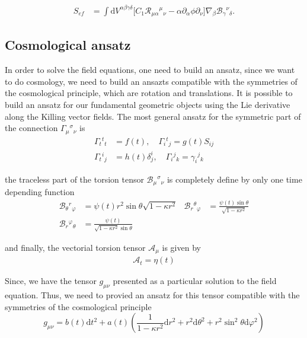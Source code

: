 \documentclass[10pt,a4paper]{article}
\begin{document}
\begin{equation*}
    \begin{split}
      S_{ef}
      & =
      \int  \mathrm{d}V^{\alpha \beta \gamma \delta} \bigg[
      C_1 \mathcal{R}_{\mu\alpha}{}^{\mu}{}_{\nu} - \alpha \partial_{\alpha}\phi \partial_{\nu}
      \bigg]\nabla_\beta \mathcal{B}_{\gamma}{}^{\nu}{}_{\delta}.
    \end{split}
  \end{equation*}


\subsection{Cosmological ansatz}

In order to solve the field equations, one need to build an ansatz, since we want to do cosmology, we need to build an ansazts
compatible with the symmetries of the cosmological principle, which are rotation and translations. It is possible to build an ansatz for our
fundamental geometric objects using the Lie derivative along the Killing vector fields. The most general ansatz for the symmetric part of the 
connection $\Gamma_{\mu}{}^{\sigma}{}_{\nu}$ is
\begin{align}
      \Gamma_{t}{}^{t}{ }_{t} & =f(t), \quad \Gamma_{i}{ }^{t}{ }_{j}=g(t) S_{i j} \\
      \Gamma_{t}{ }^{i}{ }_{j} &= h(t) \delta^{i}_{j}, \quad \Gamma_{i}{ }^{j}{ }_{k}= \gamma_{i}{ }^{j}{ }_{k}
\end{align}
  
the traceless part of the torsion tensor $\mathcal{B}_{\mu}{}^{\sigma}{}_{\nu}$ is completely define by only one time depending function
  \begin{align*}
      \mathcal{B}_{\theta}{ }^{r}{ }_{\varphi} & = \psi (t) r^2\sin\theta \sqrt{1 - \kappa r^2} &
      \mathcal{B}_{r}{}^{\theta}{}_{\varphi} & =\frac{\psi (t) \sin \theta}{\sqrt{1 - \kappa r^2}} \\
      \mathcal{B}_{r}{}^{\varphi}{}_{\theta} & =\frac{\psi(t)}{ \sqrt{1-\kappa r^{2}} \sin \theta}
  \end{align*}
  
and finally, the vectorial torsion tensor $\mathcal{A}_\mu$ is given by
  \begin{align}
      \mathcal{A}_{t} = \eta(t)
  \end{align}

Since, we have the tensor $g_{\mu\nu}$ presented as a particular solution to the field equation. Thus, we need to provied
an ansatz for this tensor compatible with the symmetries of the cosmological principle
\begin{equation}
  g_{\mu\nu} = b(t)\mathrm{d}t^2 + a(t)\left(\frac{1}{1 - \kappa r^2} \mathrm{d}r^2 + r^2 \mathrm{d}\theta^2 
  + r^2 \sin^2 \theta \mathrm{d} \varphi^2 \right)
\end{equation}
\end{document}
